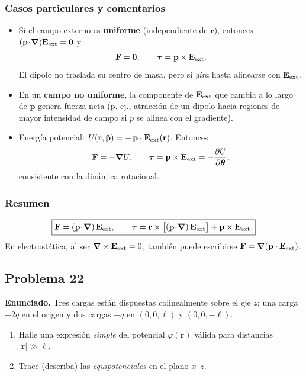 \documentclass{article}
\begin{document}
\subsubsection*{Casos particulares y comentarios}
\begin{itemize}
\item Si el campo externo es \textbf{uniforme} (independiente de $\mathbf r$), entonces $(\mathbf p\!\cdot\!\boldsymbol{\nabla})\mathbf E_{\rm ext}=\mathbf 0$ y
\[
\mathbf F=\mathbf 0,\qquad \boldsymbol{\tau}=\mathbf p\times\mathbf E_{\rm ext}.
\]
El dipolo no traslada su centro de masa, pero sí \emph{gira} hasta alinearse con $\mathbf E_{\rm ext}$.
\item En un \textbf{campo no uniforme}, la componente de $\mathbf E_{\rm ext}$ que cambia a lo largo de $\mathbf p$ genera fuerza neta (p. ej., atracción de un dipolo hacia regiones de mayor intensidad de campo si $p$ se alinea con el gradiente).
\item Energía potencial: $U(\mathbf r,\hat{\mathbf p})=-\,\mathbf p\cdot\mathbf E_{\rm ext}(\mathbf r)$. Entonces
\[
\mathbf F=-\boldsymbol{\nabla}U,\qquad
\boldsymbol{\tau}=\mathbf p\times\mathbf E_{\rm ext}=-\frac{\partial U}{\partial\boldsymbol{\theta}},
\]
consistente con la dinámica rotacional.
\end{itemize}

\subsubsection*{Resumen}
\[
\boxed{
\mathbf F=(\mathbf p\!\cdot\!\boldsymbol{\nabla})\,\mathbf E_{\rm ext},\qquad
\boldsymbol{\tau}=\mathbf r\times\big[(\mathbf p\!\cdot\!\boldsymbol{\nabla})\,\mathbf E_{\rm ext}\big]+\mathbf p\times\mathbf E_{\rm ext}.
}
\]
En electrostática, al ser $\boldsymbol{\nabla}\times\mathbf E_{\rm ext}=0$, también puede escribirse $\mathbf F=\boldsymbol{\nabla}(\mathbf p\cdot\mathbf E_{\rm ext})$.



\subsection{Problema 22} \vspace{0.5cm}

\textbf{Enunciado.} Tres cargas están dispuestas colinealmente sobre el eje $z$: una carga $-2q$ en el origen y dos cargas $+q$ en $(0,0,\ell)$ y $(0,0,-\ell)$. 
\begin{enumerate}[label=(\alph*)]
\item Halle una expresión \emph{simple} del potencial $\varphi(\mathbf r)$ válida para distancias $\lvert\mathbf r\rvert\gg \ell$.
\item Trace (describa) las \emph{equipotenciales} en el plano $x$–$z$.
\end{enumerate}
\end{document}
